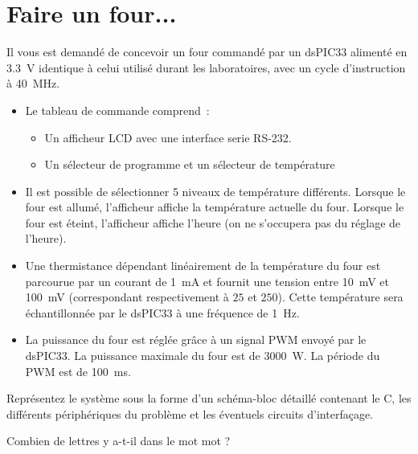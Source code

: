 \documentclass{exam}
\author{Ken Hasselmann}
\begin{document}

\vspace{5cm}
\newpage

\section{Faire un four...}

Il vous est demandé de concevoir un four commandé par un dsPIC33 alimenté en 3.3~V identique à celui utilisé durant les laboratoires, avec un cycle d'instruction à 40~MHz.

\begin{itemize}
	\item Le tableau de commande comprend~:
	\begin{itemize}
		\item Un afficheur LCD avec une interface serie RS-232.
		\item Un sélecteur de programme et un sélecteur de température
	\end{itemize}

	\item Il est possible de sélectionner 5 niveaux de température différents.
	Lorsque le four est allumé, l'afficheur affiche la température actuelle du four.
	Lorsque le four est éteint, l'afficheur affiche l'heure (on ne s'occupera pas du réglage de l'heure).

	\item Une thermistance dépendant linéairement de la température du four est parcourue par un courant de 1~mA et fournit une tension entre 10~mV et 100~mV (correspondant respectivement à $25$ et $250$).
	Cette température sera échantillonnée par le dsPIC33 à une fréquence de 1~Hz.

	\item La puissance du four est réglée grâce à un signal PWM envoyé par le dsPIC33.
	La puissance maximale du four est de 3000~W.
	La période du PWM est de 100~ms.

\end{itemize}

{
	Représentez le système sous la forme d'un schéma-bloc détaillé contenant le C, les différents périphériques du problème et les éventuels circuits d'interfaçage.

}
{}

{
    Combien de lettres y a-t-il dans le mot mot ?
}
{}

\end{document}
